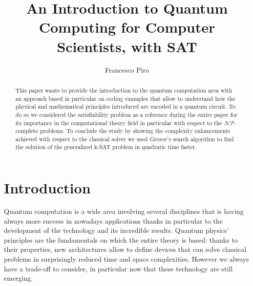 \documentclass[english]{article}
\begin{document}
	\title{An Introduction to Quantum Computing for Computer Scientists, with SAT}
	\author{Francesco Piro}
	\maketitle
	
	\begin{abstract}
		This paper wants to provide the introduction to the quantum computation area with an approach based in particular on coding examples that allow to understand how the physical and mathematical principles introduced are encoded in a quantum circuit. To do so we considered the satisfiability problem as a reference during the entire paper for its importance in the computational theory field in particular with respect to the $\mathcal{N}\mathcal{P}$-complete problems. To conclude the study by showing the complexity enhancements achieved with respect to the classical solver we used Grover's search algorithm to find the solution of the generalized k-SAT problem in quadratic time faster.
	\end{abstract}

	\section*{Introduction}
	\label{sec:introduction}
	Quantum computation is a wide area involving several disciplines that is having always more success in nowadays applications thanks in particular to the development of the technology and its incredible results. Quantum physics' principles are the fundamentals on which the entire theory is based: thanks to their properties, new architectures allow to define devices that can solve classical problems in surprisingly reduced time and space complexities. However we always have a trade-off to consider, in particular now that these technology are still emerging.\\
	
\end{document}
